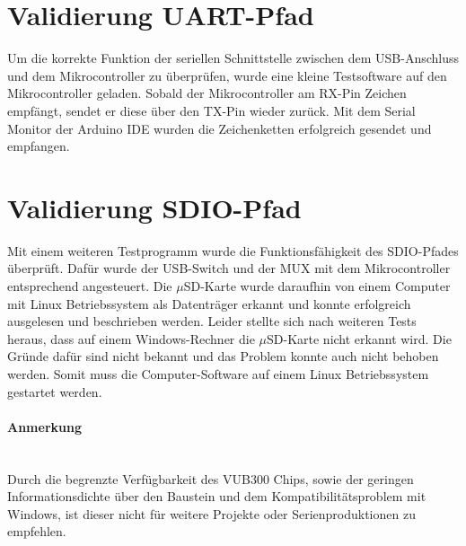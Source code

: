 \section{Validierung UART-Pfad}

Um die korrekte Funktion der seriellen Schnittstelle zwischen dem USB-Anschluss und dem Mikrocontroller zu überprüfen, wurde eine kleine Testsoftware auf den Mikrocontroller geladen. Sobald der Mikrocontroller am RX-Pin Zeichen empfängt, sendet	er diese über den TX-Pin wieder zurück. Mit dem Serial Monitor der Arduino IDE wurden die Zeichenketten erfolgreich gesendet und empfangen.

\section{Validierung SDIO-Pfad}

Mit einem weiteren Testprogramm wurde die Funktionsfähigkeit des SDIO-Pfades überprüft. Dafür wurde der USB-Switch und der MUX mit dem Mikrocontroller entsprechend angesteuert. Die $\mu$SD-Karte wurde daraufhin von einem Computer mit Linux Betriebssystem als Datenträger erkannt und konnte erfolgreich ausgelesen und beschrieben werden. Leider stellte sich nach weiteren Tests heraus, dass auf einem Windows-Rechner die $\mu$SD-Karte nicht erkannt wird. Die Gründe dafür sind nicht bekannt und das Problem konnte auch nicht behoben werden. Somit muss die Computer-Software auf einem Linux Betriebssystem gestartet werden.
\paragraph{Anmerkung}$ $\\
Durch die begrenzte Verfügbarkeit des VUB300 Chips, sowie der geringen Informationsdichte über den Baustein und dem Kompatibilitätsproblem mit Windows, ist dieser nicht für weitere Projekte oder Serienproduktionen zu empfehlen.